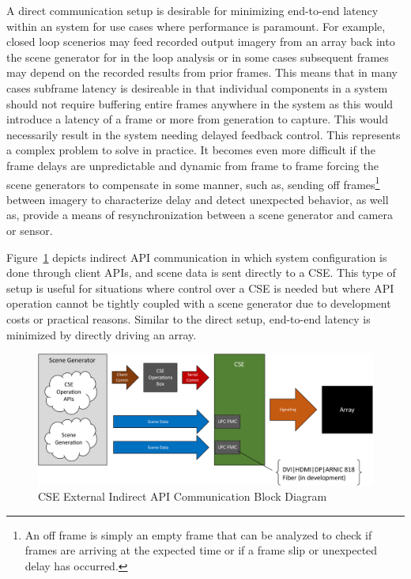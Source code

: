         A direct communication setup is desirable for minimizing end-to-end latency within an system for use cases where performance is paramount. For example, closed loop scenerios may feed recorded output imagery from an array back into the scene generator for in the loop analysis or in some cases subsequent frames may depend on the recorded results from prior frames. This means that in many cases subframe latency is desireable in that individual components in a system should not require buffering entire frames anywhere in the system as this would introduce a latency of a frame or more from generation to capture. This would necessarily result in the system needing delayed feedback control\cite{hu2002dynamics}. This represents a complex problem to solve in practice. It becomes even more difficult if the frame delays are unpredictable and dynamic from frame to frame forcing the scene generators to compensate in some manner, such as, sending off frames\footnote{An off frame is simply an empty frame that can be analyzed to check if frames are arriving at the expected time or if a frame slip or unexpected delay has occurred.} between imagery to characterize delay and detect unexpected behavior, as well as, provide a means of resynchronization between a scene generator and camera or sensor.

        Figure~\ref{fig:external_cse_comm_half_indirect} depicts indirect API communication in which system configuration is done through client APIs, and scene data is sent directly to a CSE. This type of setup is useful for situations where control over a CSE is needed but where API operation cannot be tightly coupled with a scene generator due to development costs or practical reasons. Similar to the direct setup, end-to-end latency is minimized by directly driving an array.

        \begin{figure}
            \centering
            \includegraphics[width=1.0\textwidth]{fig/external_cse_comm_half_indirect.pdf}
            \caption{CSE External Indirect API Communication Block Diagram}
            \label{fig:external_cse_comm_half_indirect}
        \end{figure}

